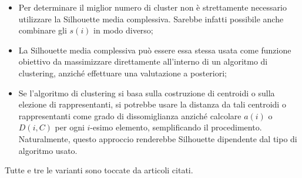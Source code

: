 \documentclass[italian]{article}
\begin{document}
		\begin{itemize}
			\item
			Per determinare il miglior numero di cluster non è strettamente
			necessario utilizzare la Silhouette media complessiva. Sarebbe
			infatti possibile anche combinare gli $s(i)$ in modo diverso;
			\item
			La Silhouette media complessiva può essere essa stessa usata
			come funzione obiettivo da massimizzare direttamente all'interno
			di un algoritmo di clustering, anziché effettuare una valutazione
			a posteriori;
			\item
			Se l'algoritmo di clustering si basa sulla costruzione di centroidi
			o sulla elezione di rappresentanti, si potrebbe usare la distanza
			da tali centroidi o rappresentanti come grado di dissomiglianza
			anziché calcolare $a(i)$ o $D(i, C)$ per ogni $i$-esimo elemento,
			semplificando il procedimento. Naturalmente, questo approccio
			renderebbe Silhouette dipendente dal tipo di algoritmo usato. 
		\end{itemize}

		Tutte e tre le varianti sono toccate da articoli citati.
\end{document}
